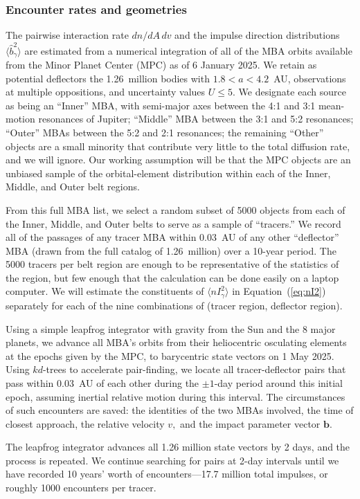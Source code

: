 \documentclass[linenumbers, onecolumn]{aastex631}
\newcommand{\eqq}[1]{Equation~(\ref{#1})}
\newcommand{\vecb}{\mathbf{b}}
\begin{document}
\subsubsection{Encounter rates and geometries}
The pairwise interaction rate $dn/dA\,dv$ and the impulse direction
distributions $\langle \hat b^2_\gamma \rangle$ are estimated from a
numerical integration of all of the MBA orbits available
from the Minor Planet Center (MPC) as of 6 January 2025.   We retain as
potential deflectors the 1.26~million bodies with $1.8<a<4.2$~AU,
observations at multiple oppositions, and uncertainty values $U\le5.$
We designate each source as being an ``Inner'' MBA, with semi-major axes between the 4:1 and 3:1
mean-motion resonances of Jupiter; ``Middle'' MBA between the 3:1 and
5:2 resonances; ``Outer'' MBAs between the 5:2 and 2:1
resonances; the remaining ``Other'' objects are a small minority that
contribute very little to the total diffusion rate, and we will ignore.  Our working
assumption will be that the MPC objects are an unbiased sample of the
orbital-element distribution within each of the Inner, Middle, and
Outer belt regions.

From this full MBA list, we select a random subset of 5000 objects
from each of the Inner, Middle, and Outer belts to serve as a sample
of ``tracers.''  We record all of the passages of any tracer MBA
within 0.03~AU of any other ``deflector'' MBA (drawn from the full
catalog of 1.26~million) over a 10-year period.  The 5000 tracers per
belt region are enough to be representative of the statistics of
the region, but few enough that the calculation can be done easily
on a laptop computer.
We will estimate the constituents of  $\langle nI_\gamma^2\rangle$ in
\eqq{eq:nI2} separately for each of the nine combinations of (tracer region, deflector region). 


Using a simple leapfrog integrator with gravity from the Sun and the 8
major planets, we advance all MBA's orbits from their heliocentric
osculating elements at the epochs given by the MPC, to barycentric
state vectors on 1 May 2025.  Using $kd$-trees to accelerate
pair-finding, we locate all tracer-deflector pairs
that pass within 0.03~AU of each other during the $\pm1$-day period
around this initial epoch, assuming inertial relative motion during
this interval.  The circumstances of such encounters are saved: the
identities of the two MBAs involved, the time of closest approach, the
relative velocity $v,$ and the impact parameter vector $\vecb.$

The leapfrog integrator advances all 1.26 million state vectors by 2
days, and the process is repeated.  We continue searching for pairs at
2-day intervals until we have recorded 10 years' worth of encounters---17.7 million
total impulses, or roughly 1000 encounters per tracer.
\end{document}
